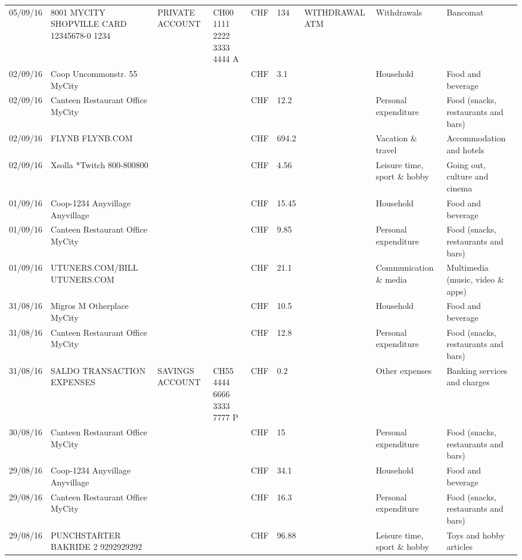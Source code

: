 \begin{landscape}
\begin{center}
\begin{longtable}{lllllllll}
		05/09/16 & 8001 MYCITY SHOPVILLE CARD 12345678-0 1234 & PRIVATE ACCOUNT & CH00 1111 2222 3333 4444 A & CHF   & 134   & WITHDRAWAL ATM & Withdrawals & Bancomat \\
		02/09/16 & Coop Uncommonstr. 55   MyCity &       &       & CHF   & 3.1   &       & Household & Food and beverage \\
		02/09/16 & Canteen Restaurant Office      MyCity &       &       & CHF   & 12.2  &       & Personal expenditure & Food (snacks, restaurants and bars) \\
		02/09/16 & FLYNB                   FLYNB.COM &       &       & CHF   & 694.2 &       & Vacation \& travel & Accommodation and hotels \\
		02/09/16 & Xsolla *Twitch           800-800800 &       &       & CHF   & 4.56  &       & Leisure time, sport \& hobby & Going out, culture and cinema \\
		01/09/16 & Coop-1234 Anyvillage    Anyvillage &       &       & CHF   & 15.45 &       & Household & Food and beverage \\
		01/09/16 & Canteen Restaurant Office      MyCity &       &       & CHF   & 9.85  &       & Personal expenditure & Food (snacks, restaurants and bars) \\
		01/09/16 & UTUNERS.COM/BILL          UTUNERS.COM &       &       & CHF   & 21.1  &       & Communication \& media & Multimedia (music, video \& apps) \\
		31/08/16 & Migros M Otherplace   MyCity &       &       & CHF   & 10.5  &       & Household & Food and beverage \\
		31/08/16 & Canteen Restaurant Office      MyCity &       &       & CHF   & 12.8  &       & Personal expenditure & Food (snacks, restaurants and bars) \\
		31/08/16 & SALDO TRANSACTION EXPENSES & SAVINGS ACCOUNT & CH55 4444 6666 3333 7777 P & CHF   & 0.2   &       & Other expenses & Banking services and charges \\
		30/08/16 & Canteen Restaurant Office      MyCity &       &       & CHF   & 15    &       & Personal expenditure & Food (snacks, restaurants and bars) \\
		29/08/16 & Coop-1234 Anyvillage    Anyvillage &       &       & CHF   & 34.1  &       & Household & Food and beverage \\
		29/08/16 & Canteen Restaurant Office      MyCity &       &       & CHF   & 16.3  &       & Personal expenditure & Food (snacks, restaurants and bars) \\
		29/08/16 & PUNCHSTARTER BAKRIDE 2   9292929292 &       &       & CHF   & 96.88 &       & Leisure time, sport \& hobby & Toys and hobby articles \\

\end{longtable}
\end{center}
\end{landscape}
